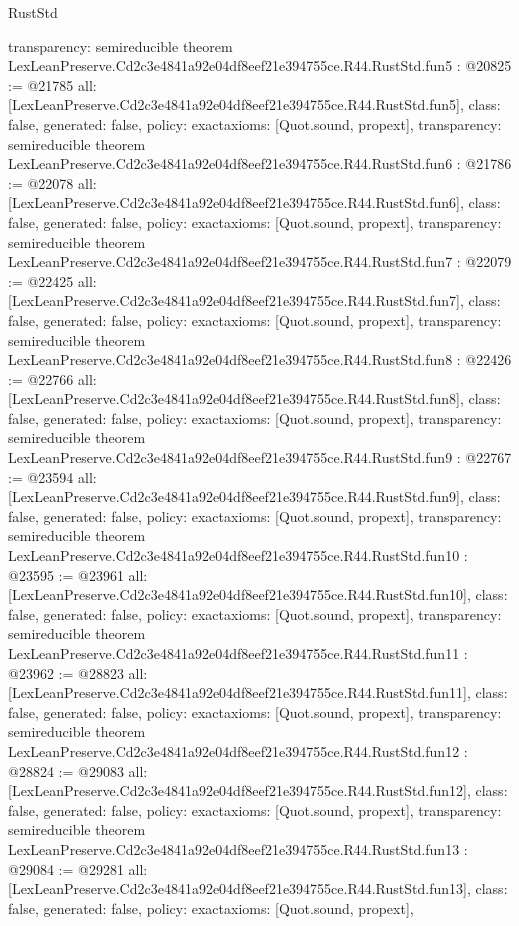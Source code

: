 \begin{lexlean}{RustStd}
\begin{coremodule}
{  transparency: semireducible
}
theorem LexLeanPreserve.Cd2c3e4841a92e04df8eef21e394755ce.R44.RustStd.fun5 : @20825 := @21785 {
  all: [LexLeanPreserve.Cd2c3e4841a92e04df8eef21e394755ce.R44.RustStd.fun5],
  class: false,
  generated: false,
  policy: exact{axioms: [Quot.sound, propext]},
  transparency: semireducible
}
theorem LexLeanPreserve.Cd2c3e4841a92e04df8eef21e394755ce.R44.RustStd.fun6 : @21786 := @22078 {
  all: [LexLeanPreserve.Cd2c3e4841a92e04df8eef21e394755ce.R44.RustStd.fun6],
  class: false,
  generated: false,
  policy: exact{axioms: [Quot.sound, propext]},
  transparency: semireducible
}
theorem LexLeanPreserve.Cd2c3e4841a92e04df8eef21e394755ce.R44.RustStd.fun7 : @22079 := @22425 {
  all: [LexLeanPreserve.Cd2c3e4841a92e04df8eef21e394755ce.R44.RustStd.fun7],
  class: false,
  generated: false,
  policy: exact{axioms: [Quot.sound, propext]},
  transparency: semireducible
}
theorem LexLeanPreserve.Cd2c3e4841a92e04df8eef21e394755ce.R44.RustStd.fun8 : @22426 := @22766 {
  all: [LexLeanPreserve.Cd2c3e4841a92e04df8eef21e394755ce.R44.RustStd.fun8],
  class: false,
  generated: false,
  policy: exact{axioms: [Quot.sound, propext]},
  transparency: semireducible
}
theorem LexLeanPreserve.Cd2c3e4841a92e04df8eef21e394755ce.R44.RustStd.fun9 : @22767 := @23594 {
  all: [LexLeanPreserve.Cd2c3e4841a92e04df8eef21e394755ce.R44.RustStd.fun9],
  class: false,
  generated: false,
  policy: exact{axioms: [Quot.sound, propext]},
  transparency: semireducible
}
theorem LexLeanPreserve.Cd2c3e4841a92e04df8eef21e394755ce.R44.RustStd.fun10 : @23595 := @23961 {
  all: [LexLeanPreserve.Cd2c3e4841a92e04df8eef21e394755ce.R44.RustStd.fun10],
  class: false,
  generated: false,
  policy: exact{axioms: [Quot.sound, propext]},
  transparency: semireducible
}
theorem LexLeanPreserve.Cd2c3e4841a92e04df8eef21e394755ce.R44.RustStd.fun11 : @23962 := @28823 {
  all: [LexLeanPreserve.Cd2c3e4841a92e04df8eef21e394755ce.R44.RustStd.fun11],
  class: false,
  generated: false,
  policy: exact{axioms: [Quot.sound, propext]},
  transparency: semireducible
}
theorem LexLeanPreserve.Cd2c3e4841a92e04df8eef21e394755ce.R44.RustStd.fun12 : @28824 := @29083 {
  all: [LexLeanPreserve.Cd2c3e4841a92e04df8eef21e394755ce.R44.RustStd.fun12],
  class: false,
  generated: false,
  policy: exact{axioms: [Quot.sound, propext]},
  transparency: semireducible
}
theorem LexLeanPreserve.Cd2c3e4841a92e04df8eef21e394755ce.R44.RustStd.fun13 : @29084 := @29281 {
  all: [LexLeanPreserve.Cd2c3e4841a92e04df8eef21e394755ce.R44.RustStd.fun13],
  class: false,
  generated: false,
  policy: exact{axioms: [Quot.sound, propext]},
}
\end{coremodule}
\end{lexlean}
